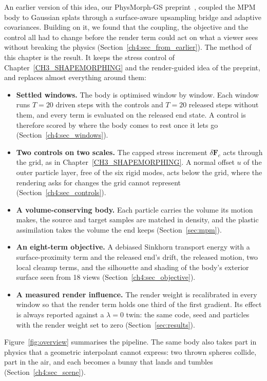 An earlier version of this idea, our PhysMorph-GS preprint~\citep{song2025physmorphgs}, coupled the MPM body to
Gaussian splats through a surface-aware upsampling bridge and adaptive covariances. Building on it, we found that
the coupling, the objective and the control all had to change before the render term could act on what a viewer
sees without breaking the physics (Section~\ref{ch4:sec_from_earlier}). The method of this chapter is the result.
It keeps the stress control of Chapter~\ref{CH3_SHAPEMORPHING} and the render-guided idea of the preprint, and
replaces almost everything around them:
\begin{itemize}
  \item \textbf{Settled windows.} The body is optimised window by window. Each window runs $T=20$ driven steps
        with the controls and $T=20$ released steps without them, and every term is evaluated on the released
        end state. A control is therefore scored by where the body comes to rest once it lets go
        (Section~\ref{ch4:sec_windows}).
  \item \textbf{Two controls on two scales.} The capped stress increment $\delta\mathbf{F}_c$ acts through the grid,
        as in Chapter~\ref{CH3_SHAPEMORPHING}. A normal offset $u$ of the outer particle layer, free of the six
        rigid modes, acts below the grid, where the rendering asks for changes the grid cannot represent
        (Section~\ref{ch4:sec_controls}).
  \item \textbf{A volume-conserving body.} Each particle carries the volume its motion makes, the source and
        target samples are matched in density, and the plastic assimilation takes the volume the end keeps
        (Section~\ref{sec:mpm}).
  \item \textbf{An eight-term objective.} A debiased Sinkhorn transport energy with a surface-proximity term and the
        released end's drift, the released motion, two local cleanup terms, and the silhouette and shading of the
        body's exterior surface seen from 18 views (Section~\ref{ch4:sec_objective}).
  \item \textbf{A measured render influence.} The render weight is recalibrated in every window so that the render
        term holds one third of the first gradient. Its effect is always reported against a $\lambda=0$ twin:
        the same code, seed and particles with the render weight set to zero (Section~\ref{sec:results}).
\end{itemize}
Figure~\ref{fig:overview} summarises the pipeline. The same body also takes part in physics that a geometric
interpolant cannot express: two thrown spheres collide, part in the air, and each becomes a bunny that lands and
tumbles (Section~\ref{ch4:sec_scene}).

